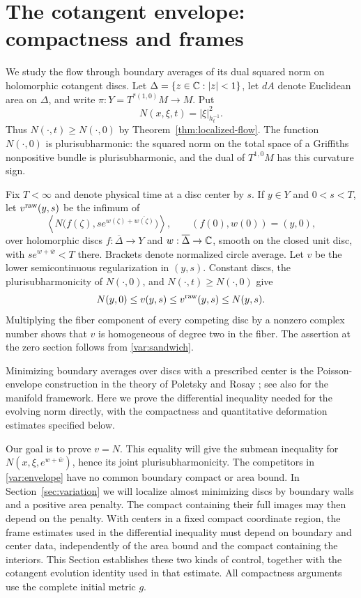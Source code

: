 \section{The cotangent envelope: compactness and frames}
\label{sec:discs}

We study the flow through boundary averages of its dual squared norm on
holomorphic cotangent discs.  Let $\Delta=\{z\in\mathbb C:|z|<1\}$, let $dA$
denote Euclidean area on $\Delta$, and write
$\pi:Y=T^{*(1,0)}M\to M$.  Put
\[
 N(x,\xi,t)=|\xi|^2_{h_t^{-1}}.
\]
Thus $N(\cdot,t)\ge N(\cdot,0)$ by
Theorem~\ref{thm:localized-flow}.  The function $N(\cdot,0)$ is
plurisubharmonic: the squared norm on the total space of a Griffiths
nonpositive bundle is plurisubharmonic, and the dual of $T^{1,0}M$ has
this curvature sign.

Fix $T<\infty$ and denote physical time at a disc center by $s$.
If $y\in Y$ and $0<s<T$, let $v^{\rm raw}(y,s)$ be the infimum of
\begin{equation}
 \left\langle N\bigl(f(\zeta),s e^{w(\zeta)+\overline{w(\zeta)}}\bigr)
 \right\rangle,
 \qquad (f(0),w(0))=(y,0),
 \label{var:envelope}
\end{equation}
over holomorphic discs $f:\overline\Delta\to Y$ and
$w:\overline\Delta\to\mathbb C$, smooth on the closed unit disc, with
$s e^{w+\bar w}<T$ there.  Brackets denote normalized circle average.
Let $v$ be the lower semicontinuous regularization in $(y,s)$.
Constant discs, the plurisubharmonicity of $N(\cdot,0)$, and
$N(\cdot,t)\ge N(\cdot,0)$ give
\begin{equation}
 N(y,0)\le v(y,s)\le v^{\rm raw}(y,s)\le N(y,s).
 \label{var:sandwich}
\end{equation}
Multiplying the fiber component of every competing disc by a nonzero
complex number shows that $v$ is homogeneous of degree two in the fiber.
The assertion at the zero section follows from \eqref{var:sandwich}.

Minimizing boundary averages over discs with a prescribed center is the
Poisson-envelope construction in the theory of Poletsky and Rosay
\cite{Poletsky1991,Rosay2003}; see also
\cite[Sections~1--2]{LarussonSigurdsson} for the manifold framework.
Here we prove the differential inequality needed for the evolving norm
directly, with the compactness and quantitative deformation estimates
specified below.

Our goal is to prove $v=N$.  This equality will give the submean
inequality for $N(x,\xi,e^{w+\bar w})$, hence its joint
plurisubharmonicity.  The competitors in \eqref{var:envelope} have no
common boundary compact or area bound.  In Section~\ref{sec:variation}
we will localize almost minimizing discs by boundary walls and a positive
area penalty.  The compact containing their full images may then depend
on the penalty.  With centers in a fixed compact coordinate region, the
frame estimates used in the differential inequality must depend on
boundary and center data, independently of the area bound and the
compact containing the interiors.  This Section establishes these two
kinds of control, together with the cotangent evolution identity used
in that estimate.  All compactness arguments use the complete initial
metric $g$.

